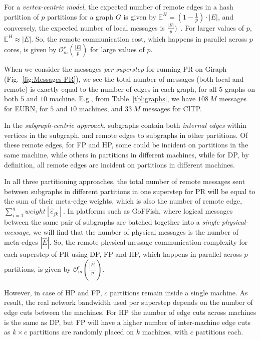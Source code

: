 \documentclass[10pt,conference, compsocconf]{IEEEtran}
\begin{document}
For a \emph{vertex-centric model}, the expected number of remote edges in a hash partition of $p$ partitions for a graph $G$ is given by $\mathbb{E}^H = (1-\frac{1}{p}) \cdot |E|$, and conversely, the expected number of local messages is $\frac{|E|}{p})$~\cite{powergraph}. For larger values of $p$, $\mathbb{E}^H \approx |E|$. So, the remote communication cost, which happens in parallel across $p$ cores, is given by $\mathcal{O}_m^r(\frac{|E|}{p})$ for large values of $p$.

When we consider the messages \emph{per superstep} for running PR on Giraph (Fig.~\ref{fig:Messages-PR}), we see the total number of messages (both local and remote) is exactly equal to the number of edges in each graph, for all $5$ graphs on both $5$ and $10$ machine. E.g., from Table~\ref{tbl:graphs}, we have $108~M$ messages for EURN, for $5$ and $10$ machines, and $33~M$ messages for CITP.

In the \emph{subgraph-centric approach}, subgraphs contain both \emph{internal edges} within vertices in the subgraph, and remote edges to subgraphs in other partitions. Of these remote edges, for FP and HP, some could be incident on partitions in the same machine, while others in partitions in different machines, while for DP, by definition, all remote edges are incident on partitions in different machines.

In all three partitioning approaches, the total number of remote messages sent between subgraphs in different partitions in one superstep for PR will be equal to the sum of their meta-edge weights, which is also the number of remote edge, $\sum_{i=1}^q weight[\widehat{e}_{jk}]$. In platforms such as GoFFish, where logical messages between the same pair of subgraphs are batched together into a \emph{single physical-message}, we will find that the number of physical messages is the number of meta-edges $|\widehat{E}|$. So, the remote physical-message communication complexity for each superstep of PR using DP, FP and HP, which happens in parallel across $p$ partitions, is given by $\mathcal{O}_m^r(\frac{|\widehat{E}|}{p})$.

However, in case of HP and FP, $c$ partitions remain inside a single machine. As result, the real network bandwidth used per superstep depends on the number of edge cuts between the machines. For HP the number of edge cuts across machines is the same as DP, but FP will have a higher number of inter-machine edge cuts as $k \times c$ partitions are randomly placed on $k$ machines, with $c$ partitions each.
\end{document}
